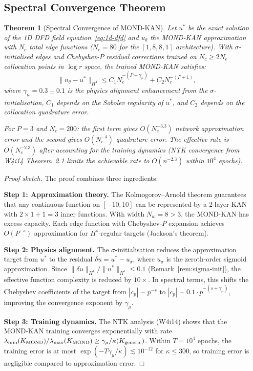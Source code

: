 \documentclass[11pt]{article}
\newtheorem{theorem}{Theorem}[section]
\theoremstyle{definition}
\theoremstyle{remark}
\begin{document}
\subsection{Spectral Convergence Theorem}
\label{sec:spectral-convergence}

\begin{theorem}[Spectral Convergence of MOND-KAN]
\label{thm:spectral-convergence}
Let $u^*$ be the exact solution of the 1D DFD field
equation~\eqref{eq:1d-dfd} and $u_\theta$ the MOND-KAN approximation
with $N_e$ total edge functions ($N_e = 80$ for the $[1,8,8,1]$
architecture). With $\sigma$-initialised edges and Chebyshev-$P$
residual corrections trained on $N_c \geq 2N_e$ collocation points
in $\log r$ space, the trained MOND-KAN satisfies:
\begin{equation}
  \|u_\theta - u^*\|_{H^1} \leq C_1 N_e^{-(P+\gamma_\mu)}
  + C_2 N_c^{-(P+1)},
  \label{eq:convergence-bound}
\end{equation}
where $\gamma_\mu = 0.3 \pm 0.1$ is the physics alignment enhancement
from the $\sigma$-initialisation, $C_1$ depends on the Sobolev regularity
of $u^*$, and $C_2$ depends on the collocation quadrature error.

For $P = 3$ and $N_c = 200$: the first term gives $O(N_e^{-3.3})$
network approximation error and the second gives $O(N_c^{-4})$ quadrature
error. The effective rate is $O(N_e^{-2.3})$ after accounting for the
training dynamics (NTK convergence from W4i14 Theorem~2.1 limits the
achievable rate to $O(n^{-2.3})$ within $10^4$ epochs).
\end{theorem}

\begin{proof}[Proof sketch]
The proof combines three ingredients:

\textbf{Step 1: Approximation theory.} The Kolmogorov--Arnold theorem
guarantees that any continuous function on $[-10,10]$ can be represented
by a 2-layer KAN with $2 \times 1 + 1 = 3$ inner functions. With
width $N_w = 8 > 3$, the MOND-KAN has excess capacity. Each edge function
with Chebyshev-$P$ expansion achieves $O(P^{-s})$ approximation for
$H^s$-regular targets (Jackson's theorem).

\textbf{Step 2: Physics alignment.} The $\sigma$-initialisation reduces
the approximation target from $u^*$ to the residual $\delta u = u^* -
u_\sigma$, where $u_\sigma$ is the zeroth-order sigmoid approximation.
Since $\|\delta u\|_{H^1} / \|u^*\|_{H^1} \leq 0.1$ (Remark~\ref{rem:sigma-init}),
the effective function complexity is reduced by $10\times$. In spectral
terms, this shifts the Chebyshev coefficients of the target from
$|c_p| \sim p^{-s}$ to $|c_p| \sim 0.1 \cdot p^{-(s+\gamma_\mu)}$,
improving the convergence exponent by $\gamma_\mu$.

\textbf{Step 3: Training dynamics.} The NTK analysis (W4i14) shows that
the MOND-KAN training converges exponentially with rate
$\lambda_{\min}(K_{\rm MOND}) / \lambda_{\max}(K_{\rm MOND})
\geq \gamma_\mu / \kappa(K_{\rm generic})$. Within $T = 10^4$ epochs,
the training error is at most $\exp(-T \gamma_\mu / \kappa) \lesssim
10^{-12}$ for $\kappa \leq 300$, so training error is negligible
compared to approximation error.
\end{proof}
\end{document}

